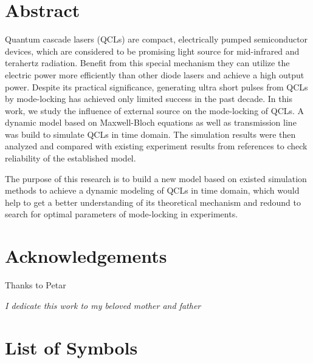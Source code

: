 \documentclass[11pt,final]{scrbook}
\begin{document}







\chapter*{Abstract}
Quantum cascade lasers (QCLs) are compact, electrically pumped semiconductor devices, which are considered to be promising light source for mid-infrared and terahertz radiation. Benefit from this special mechanism they can utilize the electric power more efficiently than other diode lasers and achieve a high output power. Despite its practical significance, generating ultra short pulses from QCLs by mode-locking has achieved only limited success in the past decade. In this work, we study the influence of external source on the mode-locking of QCLs. A dynamic model based on Maxwell-Bloch equations as well as transmission line was build to simulate QCLs in time domain. The simulation results were then analyzed and compared with existing experiment results from references to check reliability of the established model.

The purpose of this research is to build a new model based on existed simulation methods to achieve a dynamic modeling of QCLs in time domain, which would help to get a better understanding of its theoretical mechanism and redound to search for optimal parameters of mode-locking in experiments. 

\chapter*{Acknowledgements} 

Thanks to Petar

\clearpage
\thispagestyle{empty}

\vspace*{2cm}
\begin{center}
{\normalfont\itshape  I dedicate this work to my beloved mother and father}
\end{center}

\chapter*{List of Symbols}


\end{document}
